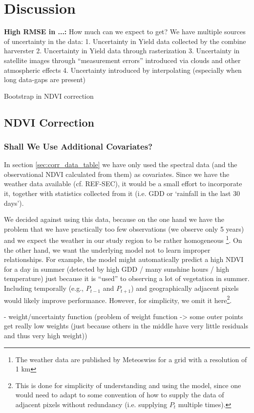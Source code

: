 \chapter{Discussion}


\textbf{High RMSE in ...:} How much can we expect to get? We have multiple sources of uncertainty in the data:
1. Uncertainty in Yield data collected by the combine harverster
2. Uncertainty in Yield data through rasterization
3. Uncertainty in satellite images through ``measurement errors'' introduced via clouds and other atmospheric effects 
4. Uncertainty introduced by interpolating (especially when long data-gaps are present)


Bootstrap in NDVI correction



\section{NDVI Correction}{
    \subsection{Shall We Use Additional Covariates?}{
        In section \ref{sec:corr_data_table} we have only used the spectral data (and the observational NDVI calculated from them) as covariates. Since we have the weather data available (cf. REF-SEC), it would be a small effort to incorporate it, together with statistics collected from it (i.e. GDD or `rainfall in the last 30 days'). 
    
        We decided against using this data, because on the one hand we have the problem that we have practically too few observations (we observe only 5 years) and we expect the weather in our study region to be rather homogeneous \footnote{The weather data are published by Meteoswiss for a grid with a resolution of 1 km}. On the other hand, we want the underlying model not to learn improper relationships. For example, the model might automatically predict a high NDVI for a day in summer (detected by high GDD / many sunshine hours / high temperature) just because it is ``used'' to observing a lot of vegetation in summer. 
        Including temporally (e.g., $P_{t-1}$ and $P_{t+1}$) and geographically adjacent pixels would likely improve performance. However, for simplicity, we omit it here\footnote{This is done for simplicity of understanding and using the model, since one would need to adapt to some convention of how to supply the data of adjacent pixels without redundancy (i.e. supplying $P_t$ multiple times).}.
    }

    - weight/uncertainty function 
    (problem of weight function -> some outer points get really low weights (just because others in the middle have very little residuals and thus very high weight))
}
